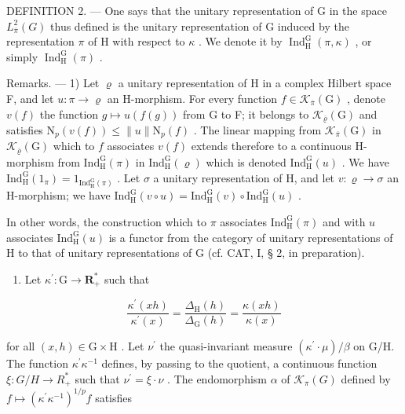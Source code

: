 DEFINITION 2. --- One says that the unitary representation of G in the space \(L_{\overline{\pi}}^{2}(G)\) thus defined is the unitary representation of G induced by the representation \(\pi\) of H with respect to \(\kappa\) . We denote it by \(\operatorname{Ind}_{\mathrm{H}}^{\mathrm{G}}(\pi, \kappa)\) , or simply \(\operatorname{Ind}_{\mathrm{H}}^{\mathrm{G}}(\pi)\) .

 Remarks. --- 1) Let \(\varrho\) a unitary representation of H in a complex Hilbert space F, and let \(u\colon\pi\to\varrho\) an H-morphism. For every function \(f\in\mathcal{K}_{\overline{\pi}}(\mathrm{G})\) , denote \(v(f)\) the function \(g\mapsto u(f(g))\) from G to F; it belongs to \(\mathcal{K}_{\overline{\varrho}}(\mathrm{G})\) and satisfies \(\mathrm{N}_{p}(v(f))\leqslant\|u\|\mathrm{N}_{p}(f)\) . The linear mapping from \(\mathcal{K}_{\overline{\pi}}(\mathrm{G})\) in \(\mathcal{K}_{\overline{\varrho}}(\mathrm{G})\) which to \(f\) associates \(v(f)\) extends therefore to a continuous H-morphism from \(\mathrm{Ind}_{\mathrm{H}}^{\mathrm{G}}(\pi)\) in \(\mathrm{Ind}_{\mathrm{H}}^{\mathrm{G}}(\varrho)\) which is denoted \(\mathrm{Ind}_{\mathrm{H}}^{\mathrm{G}}(u)\) . We have \(\mathrm{Ind}_{\mathrm{H}}^{\mathrm{G}}(1_{\pi})=1_{\mathrm{Ind}_{\mathrm{H}}^{\mathrm{G}}(\pi)}\) . Let \(\sigma\) a unitary representation of H, and let \(v\colon\varrho\to\sigma\) an H-morphism; we have \(\mathrm{Ind}_{\mathrm{H}}^{\mathrm{G}}(v\circ u)=\mathrm{Ind}_{\mathrm{H}}^{\mathrm{G}}(v)\circ\mathrm{Ind}_{\mathrm{H}}^{\mathrm{G}}(u)\) .

In other words, the construction which to \(\pi\) associates \(\mathrm{Ind}_{\mathrm{H}}^{\mathrm{G}}(\pi)\) and with \(u\) associates \(\mathrm{Ind}_{\mathrm{H}}^{\mathrm{G}}(u)\) is a functor from the category of unitary representations of H to that of unitary representations of G (cf. CAT, I, § 2, in preparation).

\begin{enumerate}
\def\labelenumi{\arabic{enumi})}
\setcounter{enumi}{1}
\tightlist
\item
  Let \(\kappa^{\prime}\colon \mathrm{G}\to \mathbf{R}_{+}^{*}\) such that
\end{enumerate}

\[
\frac {\kappa^ {\prime} (x h)}{\kappa^ {\prime} (x)} = \frac {\Delta_ {\mathrm{H}} (h)}{\Delta_ {\mathrm{G}} (h)} = \frac {\kappa (x h)}{\kappa (x)}
\]

 for all \((x,h)\in\mathrm{G}\times\mathrm{H}\) . Let \(\nu^{\prime}\) the quasi-invariant measure \((\kappa^{\prime}\cdot\mu)/\beta\) on G/H. The function \(\kappa^{\prime}\kappa^{-1}\) defines, by passing to the quotient, a continuous function \(\xi\colon G/H\to R_{+}^{*}\) such that \(\nu^{\prime}=\xi\cdot\nu\) . The endomorphism \(\alpha\) of \(\mathcal{K}_{\pi}(G)\) defined by \(f\mapsto(\kappa^{\prime}\kappa^{-1})^{1/p}f\) satisfies

